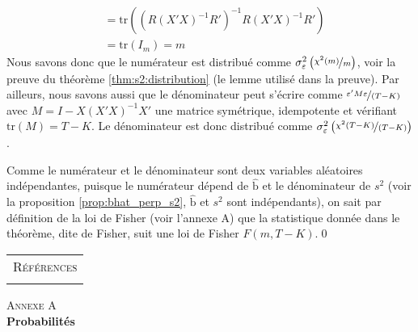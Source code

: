 \documentclass[10pt]{beamer}
\theoremstyle{plain}
\begin{document}
\begin{notes}
\[\begin{split}
                         &= \mathrm{tr}\left( \left( R(X'X)^{-1}R' \right)^{-1}R(X'X)^{-1}R'  \right)\\
                         &= \mathrm{tr} \left( I_m \right) = m
      \end{split}
    \]
    Nous savons donc que le numérateur est distribué comme $\sigma_{\varepsilon}^2\left( \nicefrac{\chi^2(m)}{m} \right)$, voir la preuve du théorème \ref{thm:s2:distribution} (le lemme utilisé dans la preuve). Par ailleurs, nous savons aussi que le dénominateur peut s'écrire comme $\nicefrac{\varepsilon' M \varepsilon}{(T-K)}$ avec $M = I-X(X'X)^{-1}X'$ une matrice symétrique, idempotente et vérifiant $\mathrm{tr}(M)=T-K$. Le dénominateur est donc distribué comme $\sigma_{\varepsilon}^2\left( \nicefrac{\chi^2\left( T-K \right)}{(T-K)} \right)$.\newline

    Comme le numérateur et le dénominateur sont deux variables aléatoires indépendantes, puisque le numérateur dépend de $\hat{\mathrm b}$ et le dénominateur de $s^2$ (voir la proposition \ref{prop:bhat_perp_s2}, $\hat{\mathrm b}$ et $s^2$ sont indépendants), on sait par définition de la loi de Fisher (voir l'annexe A) que la statistique donnée dans le théorème, dite de Fisher, suit une loi de Fisher $F(m, T-K)$.\qed

\end{notes}


\begin{notes}

  \begin{center}
    \begin{tabular}{c}
      \\
      \Huge{\textsc{Références}}\\
      \\
    \end{tabular}
  \end{center}

  \bigskip

  \printbibliography

\end{notes}



\begin{frame}
  \begin{center}
    \Huge{\textsc{Annexe A}}\\
    \Huge\textbf{Probabilités}
  \end{center}
\end{frame}
\end{document}
